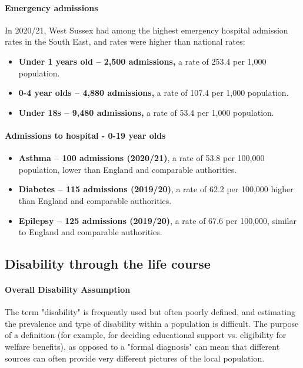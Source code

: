 \paragraph{Emergency admissions}In 2020/21, West Sussex had among the highest emergency hospital admission rates in the South East, and rates were higher than national rates:
\begin{itemize}[noitemsep]
    \item {\bfseries Under 1 years old -- 2,500 admissions,} a rate of 253.4 per 1,000 population.
    \item {\bfseries 0-4 year olds -- 4,880 admissions,} a rate of 107.4 per 1,000 population.
    \item {\bfseries Under 18s -- 9,480 admissions,} a rate of 53.4 per 1,000 population.
\end{itemize}
\paragraph{Admissions to hospital - 0-19 year olds}
\begin{itemize}[noitemsep]
    \item {\bfseries Asthma -- 100 admissions (2020/21)}, a rate of 53.8 per 100,000 population, lower than England and comparable authorities.
    \item {\bfseries Diabetes -- 115 admissions (2019/20)}, a rate of 62.2 per 100,000 higher than England and comparable authorities.
    \item {\bfseries Epilepsy -- 125 admissions (2019/20)}, a rate of 67.6 per 100,000, similar to England and comparable authorities.
\end{itemize}

\subsection{Disability through the life course}
\paragraph{Overall Disability Assumption} The term "disability" is frequently used but often poorly defined, and estimating the prevalence and type of disability within a population is difficult. The purpose of a definition (for example, for deciding educational support vs. eligibility for welfare benefits), as opposed to a "formal diagnosis" can mean that different sources can often provide very different pictures of the local population.

